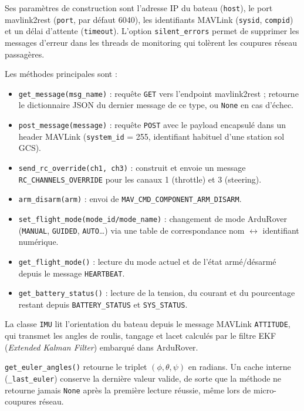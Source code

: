 Ses paramètres de construction sont l'adresse IP du bateau (\texttt{host}), le port mavlink2rest (\texttt{port}, par défaut 6040), les identifiants MAVLink (\texttt{sysid}, \texttt{compid}) et un délai d'attente (\texttt{timeout}). L'option \texttt{silent\_errors} permet de supprimer les messages d'erreur dans les threads de monitoring qui tolèrent les coupures réseau passagères.

Les méthodes principales sont :

\begin{itemize}
  \item \texttt{get\_message(msg\_name)} : requête \texttt{GET} vers l'endpoint mavlink2rest ; retourne le dictionnaire JSON du dernier message de ce type, ou \texttt{None} en cas d'échec.
  \item \texttt{post\_message(message)} : requête \texttt{POST} avec le payload encapsulé dans un header MAVLink (\texttt{system\_id} = 255, identifiant habituel d'une station sol GCS).
  \item \texttt{send\_rc\_override(ch1, ch3)} : construit et envoie un message \texttt{RC\_CHANNELS\_OVERRIDE} pour les canaux 1 (throttle) et 3 (steering).
  \item \texttt{arm\_disarm(arm)} : envoi de \texttt{MAV\_CMD\_COMPONENT\_ARM\_DISARM}.
  \item \texttt{set\_flight\_mode(mode\_id/mode\_name)} : changement de mode ArduRover (\texttt{MANUAL}, \texttt{GUIDED}, \texttt{AUTO}…) via une table de correspondance nom $\leftrightarrow$ identifiant numérique.
  \item \texttt{get\_flight\_mode()} : lecture du mode actuel et de l'état armé/désarmé depuis le message \texttt{HEARTBEAT}.
  \item \texttt{get\_battery\_status()} : lecture de la tension, du courant et du pourcentage restant depuis \texttt{BATTERY\_STATUS} et \texttt{SYS\_STATUS}.
\end{itemize}

La classe \texttt{IMU} lit l'orientation du bateau depuis le message MAVLink \texttt{ATTITUDE}, qui transmet les angles de roulis, tangage et lacet calculés par le filtre EKF (\textit{Extended Kalman Filter}) embarqué dans ArduRover.

\texttt{get\_euler\_angles()} retourne le triplet $(\phi, \theta, \psi)$ en radians. Un cache interne (\texttt{\_last\_euler}) conserve la dernière valeur valide, de sorte que la méthode ne retourne jamais \texttt{None} après la première lecture réussie, même lors de micro-coupures réseau.

